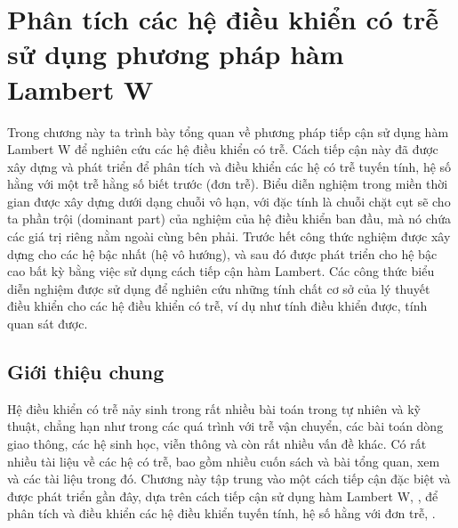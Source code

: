 \chapter{Phân tích các hệ điều khiển có trễ sử dụng phương pháp hàm Lambert W}
\setlength{\parindent}{6.5ex}

\indent Trong chương này ta trình bày tổng quan về phương pháp tiếp cận sử dụng hàm Lambert W để nghiên cứu các hệ điều khiển có trễ. 
Cách tiếp cận này đã được xây dựng và phát triển để phân tích và điều khiển các hệ có trễ tuyến tính, hệ số hằng với một trễ hằng số biết trước (đơn trễ). 
Biểu diễn nghiệm trong miền thời gian được xây dựng dưới dạng chuỗi vô hạn, với đặc tính là chuỗi chặt cụt sẽ cho ta phần trội (dominant part) của nghiệm 
của hệ điều khiển ban đầu, mà nó chứa các giá trị riêng nằm ngoài cùng bên phải. 
Trước hết công thức nghiệm được xây dựng cho các hệ bậc nhất (hệ vô hướng), và sau đó được phát triển cho hệ bậc cao bất kỳ bằng việc sử dụng cách tiếp cận hàm Lambert. Các công thức biểu diễn nghiệm được sử dụng để nghiên cứu những tính chất cơ sở của lý thuyết điều khiển cho các hệ điều khiển có trễ, ví dụ như tính điều khiển được, tính quan sát được. 

\section{Giới thiệu chung}

Hệ điều khiển có trễ nảy sinh trong rất nhiều bài toán trong tự nhiên và kỹ thuật, chẳng hạn như trong các quá trình với trễ vận chuyển, các bài toán dòng giao thông, các hệ sinh học, viễn thông và còn rất nhiều vấn đề khác. Có rất nhiều tài liệu về các hệ có trễ, bao gồm nhiều cuốn sách và bài tổng quan, xem \cite{BelC63,Gu06,Hal63,Kol99,Ric03,Sip11,Ste89} và các tài liệu trong đó. Chương này tập trung vào một cách tiếp cận đặc biệt và được phát triển gần đây, dựa trên cách tiếp cận sử dụng hàm Lambert W, \cite{Cor96}, để phân tích và điều khiển các hệ điều khiển tuyến tính, hệ số hằng với đơn trễ, \cite{Yi10}.

